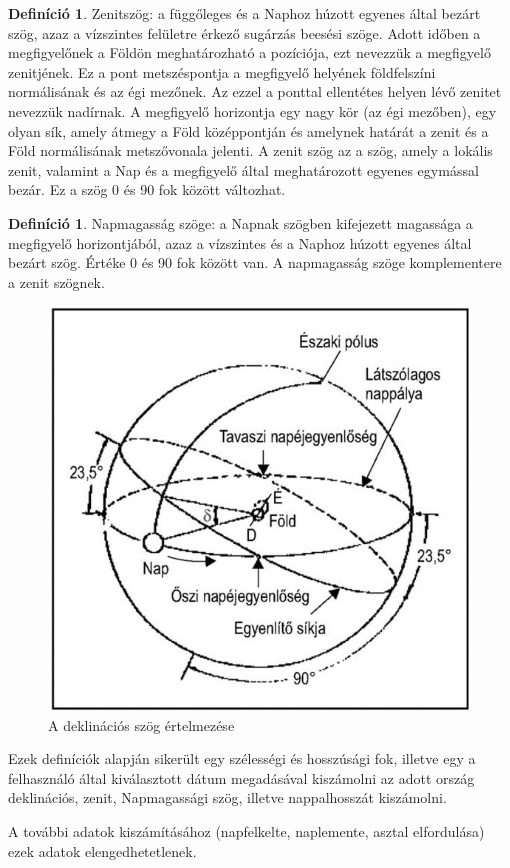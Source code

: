 \documentclass[
]{thesis-ekf}
\theoremstyle{definition}
\newtheorem{definicio}[tetel]{Definíció}
\theoremstyle{remark}
\begin{document}
			\begin{definicio}
				Zenitszög: a függőleges és a Naphoz húzott egyenes által bezárt szög, azaz a vízszintes felületre érkező sugárzás beesési szöge. Adott időben a megfigyelőnek a Földön meghatározható a pozíciója, ezt nevezzük a megfigyelő zenitjének. Ez a pont metszéspontja a megfigyelő helyének földfelszíni normálisának és az égi mezőnek. Az ezzel a ponttal ellentétes helyen lévő zenitet nevezzük nadírnak. A megfigyelő horizontja egy nagy kör (az égi mezőben), egy olyan sík, amely átmegy a Föld középpontján és amelynek határát a zenit és a Föld normálisának metszővonala jelenti. A zenit szög az a szög, amely a lokális zenit, valamint a Nap és a megfigyelő által meghatározott egyenes egymással bezár. Ez a szög 0 és 90 fok között változhat.
				\cite{Kornyezet}
			\end{definicio}
			\begin{definicio}
				Napmagasság szöge: a Napnak szögben kifejezett magassága a megfigyelő horizontjából, azaz a vízszintes és a Naphoz húzott egyenes által bezárt szög. Értéke 0 és 90 fok között van. A napmagasság szöge komplementere a zenit szögnek.
				\cite{Kornyezet}
			\end{definicio}
			\begin{figure}[h]
				\centering
				\includegraphics[scale=0.30]{./images/declination}
				\caption{A deklinációs szög értelmezése}
				\label{fig:declination}
			\end{figure}
			\par Ezek definíciók alapján sikerült egy szélességi és hosszúsági fok, illetve egy a felhasználó által kiválasztott dátum megadásával kiszámolni az adott ország deklinációs, zenit, Napmagassági szög, illetve nappalhosszát kiszámolni.
			\par A további adatok kiszámításához (napfelkelte, naplemente, asztal elfordulása) ezek adatok elengedhetetlenek.
\end{document}
